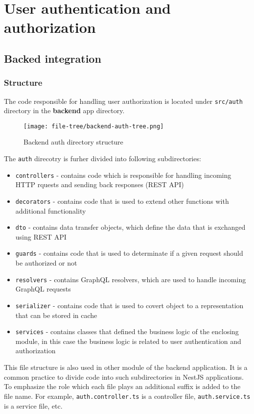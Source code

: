 \documentclass[../main.tex]{subfiles}
\begin{document}
\section{User authentication and authorization}

\subsection{Backed integration}

\subsubsection{Structure}

The code responsible for handling user authorization is located
under \texttt{src/auth} directory in the \textbf{backend} app directory.

\begin{figure}[H]
  \centering
  \texttt{[image: file-tree/backend-auth-tree.png]}
  \caption{Backend auth directory structure}
\end{figure}

The \texttt{auth} direcotry is furher divided into following subdirectories:
\begin{itemize}
  \item \texttt{controllers} - contains code which is responsible for handling incoming HTTP rquests and sending back responses (REST API)
  \item \texttt{decorators} - contains code that is used to extend other functions with additional functionality
  \item \texttt{dto} - contains data transfer objects, which define the data that is exchanged using REST API
  \item \texttt{guards} - contains code that is used to determinate if a given request should be authorized or not
  \item \texttt{resolvers} - contains GraphQL resolvers, which are used to handle incoming GraphQL requests
  \item \texttt{serializer} - contains code that is used to covert object to a representation that can be stored in cache
  \item \texttt{services} - contains classes that defined the business logic of the enclosing module, in this case the business logic is related to user authentication and authorization
\end{itemize}
This file structure is also used in other module of the backend application. It is a common practice to divide code into such subdirectories in NestJS applications.
To emphasize the role which each file plays an additional suffix is added to the file name. For example, \texttt{auth.controller.ts} is a controller file, \texttt{auth.service.ts} is a service file, etc.
\end{document}
